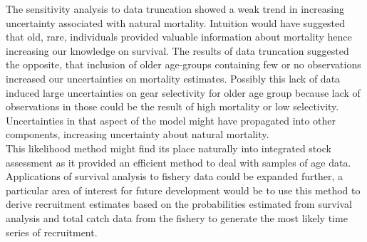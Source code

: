 The sensitivity analysis to data truncation showed a weak trend in increasing uncertainty associated with natural mortality. Intuition would have suggested that old, rare, individuals provided valuable information about mortality hence increasing our knowledge on survival. The results of data truncation suggested the opposite, that inclusion of older age-groups containing few or no observations increased our uncertainties on mortality estimates. Possibly this lack of data induced large uncertainties on gear selectivity for older age group because lack of observations in those could be the result of high mortality or low selectivity. Uncertainties in that aspect of the model might have propagated into other components, increasing uncertainty about natural mortality. \\



This likelihood method might find its place naturally into integrated stock assessment \citep{Maunder201361} as it provided an efficient method to deal with samples of age data. Applications of survival analysis to fishery data could be expanded further, a particular area of interest for future development would be to use this method to derive recruitment estimates based on the probabilities estimated from survival analysis and total catch data from the fishery to generate the most likely time series of recruitment.
